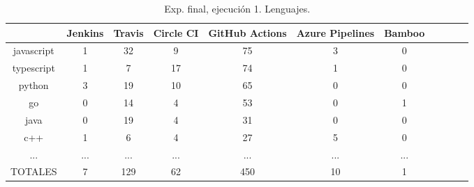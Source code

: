 \begin{table}[h]
  \centering
  \caption{Exp. final, ejecución 1. Lenguajes.}
  \label{tab:tabla_f1_2a}

\begin{footnotesize}
\renewcommand{\arraystretch}{1.5} %
\begin{tabular}{ccccccccccc}
  \hline
  {} &  Jenkins &  Travis &  Circle CI &  GitHub Actions &  Azure Pipelines &  Bamboo \\
  \hline
  javascript       &        1 &      32 &          9 &              75 &                3 &       0 \\
  typescript       &        1 &       7 &         17 &              74 &                1 &       0 \\
  python           &        3 &      19 &         10 &              65 &                0 &       0 \\
  go               &        0 &      14 &          4 &              53 &                0 &       1 \\
  java             &        0 &      19 &          4 &              31 &                0 &       0 \\
  c++              &        1 &       6 &          4 &              27 &                5 &       0 \\
  ...              &      ... &     ... &        ... &             ... &              ... &     ... \\
  TOTALES          &        7 &     129 &         62 &             450 &               10 &       1 \\
 \end{tabular}
\end{footnotesize}

\end{table}

